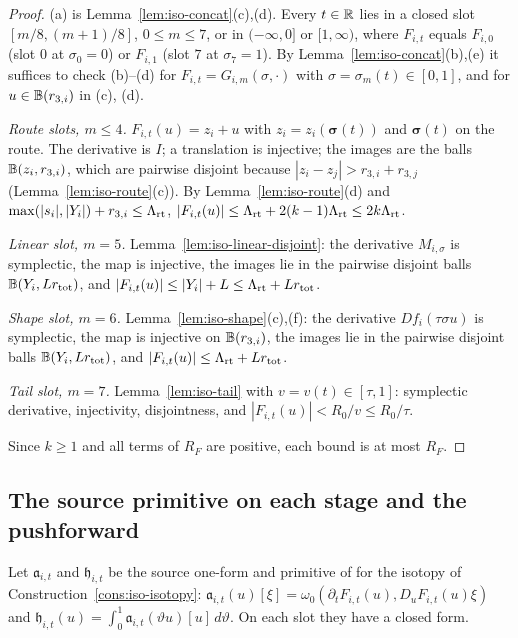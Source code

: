 \begin{proof}
(a) is Lemma~\ref{lem:iso-concat}(c),(d). Every $t\in\mathbb{R}$ lies in a closed slot $[m/8,(m+1)/8]$, $0\le m\le7$, or in
$(-\infty,0]$ or $[1,\infty)$, where $F_{i,t}$ equals $F_{i,0}$ (slot $0$ at $\sigma_0=0$) or $F_{i,1}$ (slot $7$ at
$\sigma_7=1$). By Lemma~\ref{lem:iso-concat}(b),(e) it suffices to check (b)--(d) for $F_{i,t}=G_{i,m}(\sigma,\cdot)$ with
$\sigma=\sigma_m(t)\in[0,1]$, and for $u\in\mathbb{B}(r_{3,i})$ in (c), (d).

\emph{Route slots, $m\le4$.} $F_{i,t}(u)=z_i+u$ with $z_i=z_i(\boldsymbol\sigma(t))$ and $\boldsymbol\sigma(t)$ on the route. The
derivative is $I$; a translation is injective; the images are the balls $\mathbb{B}(z_i,r_{3,i})$, which are pairwise disjoint because
$|z_i-z_j|>r_{3,i}+r_{3,j}$ (Lemma~\ref{lem:iso-route}(c)). By Lemma~\ref{lem:iso-route}(d) and
$\max(|s_i|,|Y_i|)+r_{3,i}\le\Lambda_{\rm rt}$, $|F_{i,t}(u)|\le\Lambda_{\rm rt}+2(k-1)\Lambda_{\rm rt}\le2k\Lambda_{\rm rt}$.

\emph{Linear slot, $m=5$.} Lemma~\ref{lem:iso-linear-disjoint}: the derivative $M_{i,\sigma}$ is symplectic, the map is injective,
the images lie in the pairwise disjoint balls $\mathbb{B}(Y_i,Lr_{\rm tot})$, and $|F_{i,t}(u)|\le|Y_i|+L\le\Lambda_{\rm rt}+Lr_{\rm tot}$.

\emph{Shape slot, $m=6$.} Lemma~\ref{lem:iso-shape}(c),(f): the derivative $Df_i(\tau\sigma u)$ is symplectic, the map is injective
on $\mathbb{B}(r_{3,i})$, the images lie in the pairwise disjoint balls $\mathbb{B}(Y_i,Lr_{\rm tot})$, and
$|F_{i,t}(u)|\le\Lambda_{\rm rt}+Lr_{\rm tot}$.

\emph{Tail slot, $m=7$.} Lemma~\ref{lem:iso-tail} with $v=v(t)\in[\tau,1]$: symplectic derivative, injectivity, disjointness, and
$|F_{i,t}(u)|<R_0/v\le R_0/\tau$.

Since $k\ge1$ and all terms of $R_F$ are positive, each bound is at most $R_F$.
\end{proof}

\subsection{The source primitive on each stage and the pushforward}\label{sec:iso-hamiltonian}

Let $\mathfrak a_{i,t}$ and $\mathfrak h_{i,t}$ be the source one-form and primitive of 
for the isotopy of Construction~\ref{cons:iso-isotopy}:
$\mathfrak a_{i,t}(u)[\xi]=\omega_0(\partial_tF_{i,t}(u),D_uF_{i,t}(u)\xi)$ and
$\mathfrak h_{i,t}(u)=\int_0^1\mathfrak a_{i,t}(\vartheta u)[u]\,d\vartheta$. On each slot they have a closed form.


